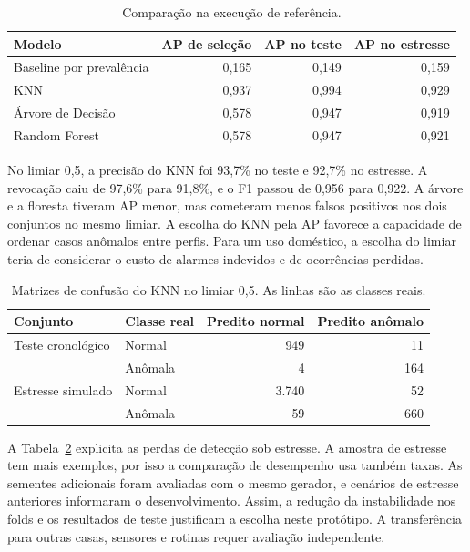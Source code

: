 \documentclass[12pt]{article}
\begin{document}
\begin{table}[ht]
\centering
\caption{Comparação na execução de referência.}
\label{tab:modelos}
\small
\begin{tabular}{lrrr}
\hline
Modelo & AP de seleção & AP no teste & AP no estresse \\
\hline
Baseline por prevalência & 0,165 & 0,149 & 0,159 \\
KNN & 0,937 & 0,994 & 0,929 \\
Árvore de Decisão & 0,578 & 0,947 & 0,919 \\
Random Forest & 0,578 & 0,947 & 0,921 \\
\hline
\end{tabular}
\end{table}

No limiar 0,5, a precisão do KNN foi 93,7\% no teste e 92,7\% no estresse. A revocação caiu de 97,6\% para 91,8\%, e o F1 passou de 0,956 para 0,922. A árvore e a floresta tiveram AP menor, mas cometeram menos falsos positivos nos dois conjuntos no mesmo limiar. A escolha do KNN pela AP favorece a capacidade de ordenar casos anômalos entre perfis. Para um uso doméstico, a escolha do limiar teria de considerar o custo de alarmes indevidos e de ocorrências perdidas.

\begin{table}[ht]
\centering
\caption{Matrizes de confusão do KNN no limiar 0,5. As linhas são as classes reais.}
\label{tab:matrizes}
\small
\begin{tabular}{llrr}
\hline
Conjunto & Classe real & Predito normal & Predito anômalo \\
\hline
Teste cronológico & Normal & 949 & 11 \\
 & Anômala & 4 & 164 \\
Estresse simulado & Normal & 3.740 & 52 \\
 & Anômala & 59 & 660 \\
\hline
\end{tabular}
\end{table}

A Tabela~\ref{tab:matrizes} explicita as perdas de detecção sob estresse. A amostra de estresse tem mais exemplos, por isso a comparação de desempenho usa também taxas. As sementes adicionais foram avaliadas com o mesmo gerador, e cenários de estresse anteriores informaram o desenvolvimento. Assim, a redução da instabilidade nos folds e os resultados de teste justificam a escolha neste protótipo. A transferência para outras casas, sensores e rotinas requer avaliação independente.
\end{document}
